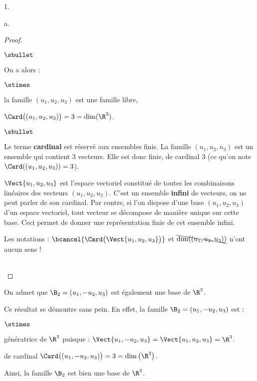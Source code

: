 \documentclass[11pt]{article}%
\begin{document}
\begin{noliste}{1.}
\begin{noliste}{a.}
\begin{proof}
\begin{noliste}{$\sbullet$}
      \item On a alors :
	\begin{noliste}{$\stimes$}
        \item la famille $(u_1, u_2, u_3)$ est une famille libre,
        \item $\Card\big( (u_1, u_2, u_3) \big) = 3 = \dim(\R^3)$.
	\end{noliste}
      \end{noliste}
      \begin{remark}%
        \begin{noliste}{$\sbullet$}
        \item Le terme {\bf cardinal} est réservé aux ensembles
          finis. La famille $(u_1, u_2, u_3)$ est un ensemble qui
          contient $3$ vecteurs. Elle est donc finie, de cardinal $3$
          (ce qu'on note $\Card((u_1, u_2, u_3)) = 3$).

        \item $\Vect{u_1, u_2, u_3}$ est l'espace vectoriel constitué
          de toutes les combinaisons linéaires des vecteurs $(u_1,
          u_2, u_3)$. C'est un ensemble {\bf infini} de vecteurs, on
          ne peut parler de son cardinal. Par contre, si l'on dispose
          d'une base $(u_1, u_2, u_3)$ d'un espace vectoriel, tout
          vecteur se décompose de manière unique sur cette base. Ceci
          permet de donner une représentation finie de cet ensemble
          infini.

        \item Les notations : $\bcancel{\Card\big( \Vect{u_1, u_2,
              u_3} \big)}$ et $\bcancel{\dim((u_1, u_2, u_3))}$ n'ont
          aucun sens !
        \end{noliste}
      \end{remark}~\\[-1.4cm]
    \end{proof}

  \end{noliste}
\end{noliste}
On admet que $\B_2 = (u_1, -u_2, u_3)$ est également une base de $\R^3$.
\begin{remarkL}{.78}%
  Ce résultat se démontre sans pein. En effet, la famille $\B_2 =
  (u_1, -u_2, u_3)$ est :
  \begin{noliste}{$\stimes$}
  \item génératrice de $\R^3$ puisque : $\Vect{ u_1, -u_2, u_3 } =
    \Vect{ u_1, u_2, u_3 } = \R^3$.
  \item de cardinal $\Card\big( (u_1, -u_2, u_3) \big) = 3 = \dim\big(
    \R^3 \big)$.
  \end{noliste}
  Ainsi, la famille $\B_2$ est bien une base de $\R^3$.  
\end{remarkL}
\end{document}
